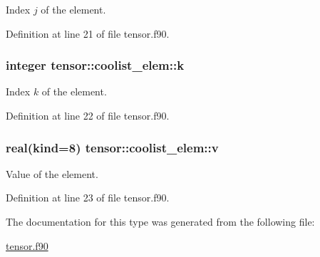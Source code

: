 Index $j$ of the element. 



Definition at line 21 of file tensor.\-f90.

\hypertarget{structtensor_1_1coolist__elem_a368c80ca537d7c5d6e1fbba8a85dec38}{
\subsubsection[{k}]{\setlength{\rightskip}{0pt plus 5cm}integer tensor\-::coolist\-\_\-elem\-::k\hspace{0.3cm}{\ttfamily [private]}}}\label{structtensor_1_1coolist__elem_a368c80ca537d7c5d6e1fbba8a85dec38}


Index $k$ of the element. 



Definition at line 22 of file tensor.\-f90.

\hypertarget{structtensor_1_1coolist__elem_ac569057f08f5f8ea171b87aa7b9dd428}{
\subsubsection[{v}]{\setlength{\rightskip}{0pt plus 5cm}real(kind=8) tensor\-::coolist\-\_\-elem\-::v\hspace{0.3cm}{\ttfamily [private]}}}\label{structtensor_1_1coolist__elem_ac569057f08f5f8ea171b87aa7b9dd428}


Value of the element. 



Definition at line 23 of file tensor.\-f90.



The documentation for this type was generated from the following file\-:\begin{DoxyCompactItemize}
\item 
\hyperlink{tensor_8f90}{tensor.\-f90}\end{DoxyCompactItemize}
